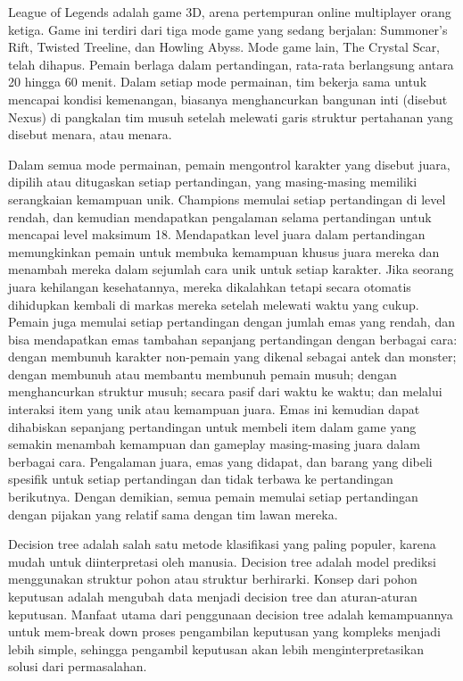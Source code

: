 \documentclass[conference]{IEEEtran}
\begin{document}
League of Legends adalah game 3D, arena pertempuran online multiplayer orang ketiga. Game ini terdiri dari tiga mode game yang sedang berjalan: Summoner's Rift, Twisted Treeline, dan Howling Abyss. Mode game lain, The Crystal Scar, telah dihapus. Pemain berlaga dalam pertandingan, rata-rata berlangsung antara 20 hingga 60 menit.  Dalam setiap mode permainan, tim bekerja sama untuk mencapai kondisi kemenangan, biasanya menghancurkan bangunan inti (disebut Nexus) di pangkalan tim musuh setelah melewati garis struktur pertahanan yang disebut menara, atau menara.

Dalam semua mode permainan, pemain mengontrol karakter yang disebut juara, dipilih atau ditugaskan setiap pertandingan, yang masing-masing memiliki serangkaian kemampuan unik. Champions memulai setiap pertandingan di level rendah, dan kemudian mendapatkan pengalaman selama pertandingan untuk mencapai level maksimum 18. Mendapatkan level juara dalam pertandingan memungkinkan pemain untuk membuka kemampuan khusus juara mereka dan menambah mereka dalam sejumlah cara unik untuk  setiap karakter.  Jika seorang juara kehilangan kesehatannya, mereka dikalahkan tetapi secara otomatis dihidupkan kembali di markas mereka setelah melewati waktu yang cukup.  Pemain juga memulai setiap pertandingan dengan jumlah emas yang rendah, dan bisa mendapatkan emas tambahan sepanjang pertandingan dengan berbagai cara: dengan membunuh karakter non-pemain yang dikenal sebagai antek dan monster;  dengan membunuh atau membantu membunuh pemain musuh;  dengan menghancurkan struktur musuh;  secara pasif dari waktu ke waktu;  dan melalui interaksi item yang unik atau kemampuan juara.  Emas ini kemudian dapat dihabiskan sepanjang pertandingan untuk membeli item dalam game yang semakin menambah kemampuan dan gameplay masing-masing juara dalam berbagai cara.  Pengalaman juara, emas yang didapat, dan barang yang dibeli spesifik untuk setiap pertandingan dan tidak terbawa ke pertandingan berikutnya.  Dengan demikian, semua pemain memulai setiap pertandingan dengan pijakan yang relatif sama dengan tim lawan mereka.

Decision tree adalah salah satu metode klasifikasi yang paling populer, karena mudah untuk diinterpretasi oleh manusia. Decision tree adalah model prediksi menggunakan struktur pohon atau struktur berhirarki. Konsep dari pohon keputusan adalah mengubah data menjadi decision tree dan aturan-aturan keputusan. Manfaat utama dari penggunaan decision tree adalah kemampuannya untuk mem-break down proses pengambilan keputusan yang kompleks menjadi lebih simple, sehingga pengambil keputusan akan lebih menginterpretasikan solusi dari permasalahan.
\end{document}
